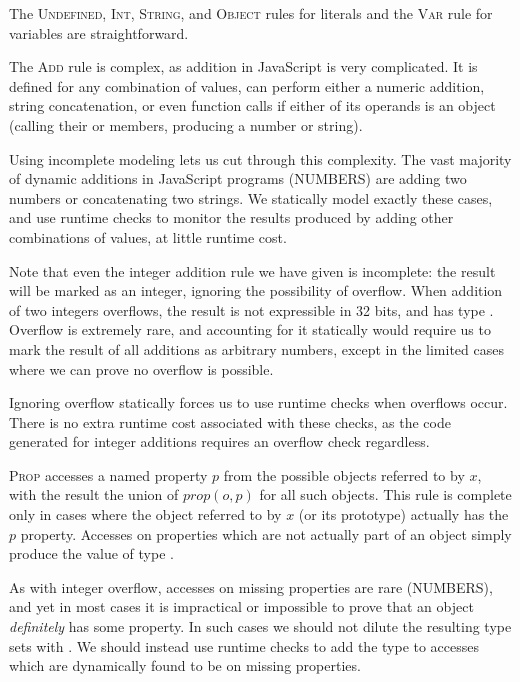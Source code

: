 The \textsc{Undefined}, \textsc{Int}, \textsc{String}, and \textsc{Object}
rules for literals and the \textsc{Var} rule for variables are
straightforward.

The \textsc{Add} rule is complex, as addition in JavaScript is very complicated. It is
defined for any combination of values, can perform either a numeric addition,
string concatenation, or even function calls if either of its operands is an
object (calling their  or  members, producing a
number or string).

Using incomplete modeling lets us cut through this complexity. The vast
majority of dynamic additions in JavaScript programs (NUMBERS) are adding two
numbers or concatenating two strings. We statically model exactly these cases,
and use runtime checks to monitor the results produced by adding other
combinations of values, at little runtime cost.

Note that even the integer addition rule we have given is incomplete: the
result will be marked as an integer, ignoring the possibility of
overflow. When addition of two integers overflows, the result is not
expressible in 32 bits, and has type . Overflow is extremely
rare, and accounting for it statically would require us to mark the result of
all additions as arbitrary numbers, except in the limited cases where we can
prove no overflow is possible.

Ignoring overflow statically forces us to use runtime checks when overflows
occur. There is no extra runtime cost associated with these checks, as the
code generated for integer additions requires an overflow check regardless.

\textsc{Prop} accesses a named property $p$ from the possible objects
referred to by $x$,
with the result the union of $\mathit{prop}(o,p)$ for all such objects.
This rule is complete only in cases where the object referred to by $x$
(or its prototype) actually has the $p$ property.
Accesses on properties which are not actually part of an object simply
produce the  value of type .

As with integer overflow, accesses on missing properties are rare (NUMBERS),
and yet in most cases it is impractical or impossible to prove that an object
\emph{definitely} has some property.  In such cases we should not dilute the
resulting type sets with . We should instead use runtime
checks to add the  type to accesses which are dynamically
found to be on missing properties.

